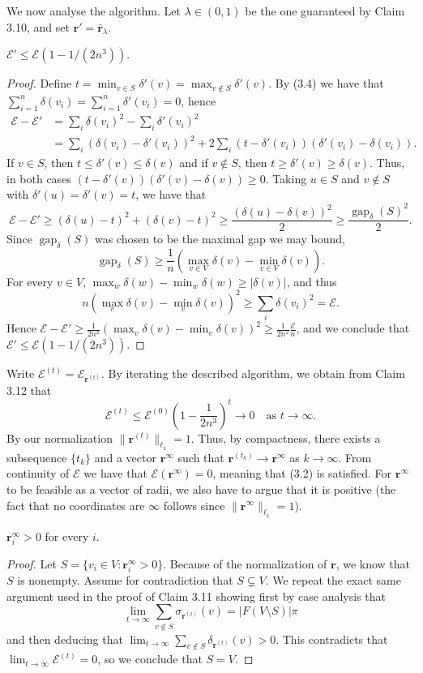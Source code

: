 We now analyse the algorithm. Let $\lambda\in(0,1)$ be the one guaranteed by Claim 3.10, and set $\mathbf r'=\bar{\mathbf r}_\lambda$.
\begin{claim}[3.12]
$\mathcal E'\le\mathcal E(1-1/(2n^3))$.
\end{claim}
\begin{proof}
Define $t=\min_{v\in S}\delta'(v)=\max_{v\notin S}\delta'(v)$. By (3.4) we have that $\sum_{i=1}^n\delta(v_i)=\sum_{i=1}^n\delta'(v_i)=0$, hence
\begin{align*}
\mathcal E-\mathcal E'
&=\sum_i\delta(v_i)^2-\sum_i\delta'(v_i)^2\\
&=\sum_i(\delta(v_i)-\delta'(v_i))^2
+2\sum_i(t-\delta'(v_i))(\delta'(v_i)-\delta(v_i)).
\end{align*}
If $v\in S$, then $t\le\delta'(v)\le\delta(v)$ and if $v\notin S$, then $t\ge\delta'(v)\ge\delta(v)$. Thus, in both cases $(t-\delta'(v))(\delta'(v)-\delta(v))\ge0$. Taking $u\in S$ and $v\notin S$ with $\delta'(u)=\delta'(v)=t$, we have that
\[
\mathcal E-\mathcal E'\ge(\delta(u)-t)^2+(\delta(v)-t)^2
\ge\frac{(\delta(u)-\delta(v))^2}{2}\ge\frac{\operatorname{gap}_\delta(S)^2}{2}.
\]
Since $\operatorname{gap}_\delta(S)$ was chosen to be the maximal gap we may bound,
\[
\operatorname{gap}_\delta(S)\ge\frac1n\left(\max_{v\in V}\delta(v)-\min_{v\in V}\delta(v)\right).
\]
For every $v\in V$, $\max_w\delta(w)-\min_w\delta(w)\ge|\delta(v)|$, and thus
\[
n\left(\max_v\delta(v)-\min_v\delta(v)\right)^2\ge\sum_i\delta(v_i)^2=\mathcal E.
\]
Hence $\mathcal E-\mathcal E'\ge\frac1{2n^2}(\max_v\delta(v)-\min_v\delta(v))^2\ge\frac1{2n^2}\frac{\mathcal E}{n}$, and we conclude that $\mathcal E'\le\mathcal E(1-1/(2n^3))$.
\end{proof}
Write $\mathcal E^{(t)}=\mathcal E_{\mathbf r^{(t)}}$. By iterating the described algorithm, we obtain from Claim 3.12 that
\[
\mathcal E^{(t)}\le\mathcal E^{(0)}\left(1-\frac1{2n^3}\right)^t\longrightarrow0\quad\text{as }t\to\infty.
\]
By our normalization $\|\mathbf r^{(t)}\|_{\ell_1}=1$. Thus, by compactness, there exists a subsequence $\{t_k\}$ and a vector $\mathbf r^\infty$ such that $\mathbf r^{(t_k)}\to\mathbf r^\infty$ as $k\to\infty$. From continuity of $\mathcal E$ we have that $\mathcal E(\mathbf r^\infty)=0$, meaning that (3.2) is satisfied. For $\mathbf r^\infty$ to be feasible as a vector of radii, we also have to argue that it is positive (the fact that no coordinates are $\infty$ follows since $\|\mathbf r^\infty\|_{\ell_1}=1$).
\begin{claim}[3.13]
$\mathbf r_i^\infty>0$ for every $i$.
\end{claim}
\begin{proof}
Let $S=\{v_i\in V:\mathbf r_i^\infty>0\}$. Because of the normalization of $\mathbf r$, we know that $S$ is nonempty. Assume for contradiction that $S\subsetneq V$. We repeat the exact same argument used in the proof of Claim 3.11 showing first by case analysis that
\[
\lim_{t\to\infty}\sum_{v\notin S}\sigma_{\mathbf r^{(t)}}(v)=|F(V\setminus S)|\pi
\]
and then deducing that $\lim_{t\to\infty}\sum_{v\notin S}\delta_{\mathbf r^{(t)}}(v)>0$.
This contradicts that $\lim_{t\to\infty}\mathcal E^{(t)}=0$, so we conclude that $S=V$.
\end{proof}

